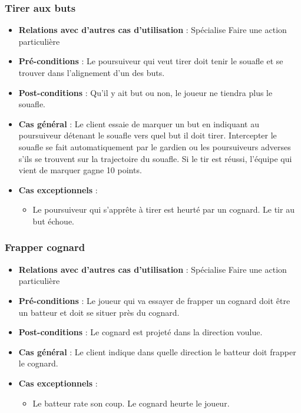 \documentclass[a4paper,titlepage]{scrreprt}
\begin{document}
     \subsubsection{Tirer aux buts}
      \begin{itemize}
        \item \textbf{Relations avec d'autres cas d'utilisation}  : Spécialise Faire une action particulière
        \item \textbf{Pré-conditions} : Le poursuiveur qui veut tirer doit tenir le souafle et se trouver dans l’alignement d’un des buts. 
        \item \textbf{Post-conditions} : Qu’il y ait but ou non, le joueur ne tiendra plus le souafle.
        \item \textbf{Cas général} : Le client essaie de marquer un but en indiquant au poursuiveur détenant le souafle vers quel but il doit tirer. Intercepter le souafle se fait automatiquement par le \gls{gardien} ou les \gls{poursuiveur}s  adverses s’ils se trouvent sur la trajectoire du souafle. Si le tir est réussi, l'équipe qui vient de marquer gagne 10 points.
        \item \textbf{Cas exceptionnels} :
          \begin{itemize}
        \item Le poursuiveur qui s'apprête à tirer est heurté par un \gls{cognard}. Le tir au but échoue. 
          \end{itemize}
      \end{itemize}
    \subsubsection{Frapper cognard}
      \begin{itemize}
        \item \textbf{Relations avec d'autres cas d'utilisation}  : Spécialise Faire une action particulière
        \item \textbf{Pré-conditions} : Le joueur qui va essayer de frapper un \gls{cognard} doit être un batteur et doit se situer près du cognard.
        \item \textbf{Post-conditions} : Le cognard est projeté dans la direction voulue.
        \item \textbf{Cas général} : Le client indique dans quelle direction le batteur doit frapper le cognard.
        \item \textbf{Cas exceptionnels} :
          \begin{itemize}
        \item Le batteur rate son coup. Le cognard heurte le joueur.
          \end{itemize}
      \end{itemize}
\end{document}
